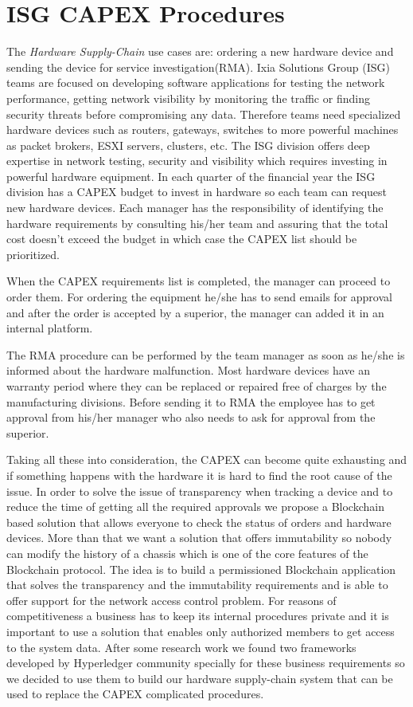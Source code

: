 \section{ISG CAPEX Procedures}
\label{sub-sec:chapter4-section1}
The \emph{Hardware Supply-Chain} use cases are: ordering a new hardware device and sending the device for service investigation(RMA).
Ixia Solutions Group (ISG) teams are focused on developing software applications for testing the network performance, getting network visibility by monitoring the traffic or finding security threats before compromising any data.
Therefore teams need specialized hardware devices such as routers, gateways, switches to more powerful machines as packet brokers, ESXI servers, clusters, etc.
The ISG division offers deep expertise in network testing, security and visibility which requires investing in powerful hardware equipment.
In each quarter of the financial year the ISG division has a CAPEX budget to invest in hardware so each team can request new hardware devices.
Each manager has the responsibility of identifying the hardware requirements by consulting his/her team and assuring that the total cost doesn't exceed the budget in which case the CAPEX list should be prioritized.

When the CAPEX requirements list is completed, the manager can proceed to order them.
For ordering the equipment he/she has to send emails for approval and after the order is accepted by a superior, the manager can added it in an internal platform.

The RMA procedure can be performed by the team manager as soon as he/she is informed about the hardware malfunction. Most hardware devices have an warranty period where they can be replaced or repaired free of charges by the manufacturing divisions. Before sending it to RMA the employee has to get approval from his/her manager who also needs to ask for approval from the superior.

Taking all these into consideration, the CAPEX can become quite exhausting and if something happens with the hardware it is hard to find the root cause of the issue. In order to solve the issue of transparency when tracking a device and to reduce the time of getting all the required approvals we propose a Blockchain based solution that allows everyone to check the status of orders and hardware devices. More than that we want a solution that offers immutability so nobody can modify the history of a chassis which is one of the core features of the Blockchain protocol.
The idea is to build a permissioned Blockchain application that solves the transparency and the immutability requirements and is able to offer support for the network access control problem.
For reasons of competitiveness a business has to keep its internal procedures private and it is important to use a solution that enables only authorized members to get access to the system data.
After some research work we found two frameworks developed by Hyperledger community specially for these business requirements so we decided to use them to build our hardware supply-chain system that can be used to replace the CAPEX complicated procedures.

